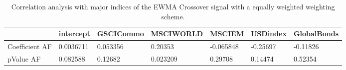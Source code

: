 \begin{table}[H]
\centering
\begin{tabular}{lllllll}
\hline& intercept & GSCICommo & MSCIWORLD & MSCIEM & USDindex & GlobalBonds \\ 
\hline 
Coefficient AF & 0.0036711 & 0.053356 & 0.20353 & -0.065848 & -0.25697 & -0.11826 \\ 
pValue AF & 0.082588 & 0.12682 & 0.023209 & 0.29708 & 0.14474 & 0.52354 \\ 
\hline
\end{tabular}
\caption{Correlation analysis with major indices of the EWMA Crossover signal with a equally weighted weighting scheme.}
\label{MBBSEWOQ_AFACTOR}
\end{table}